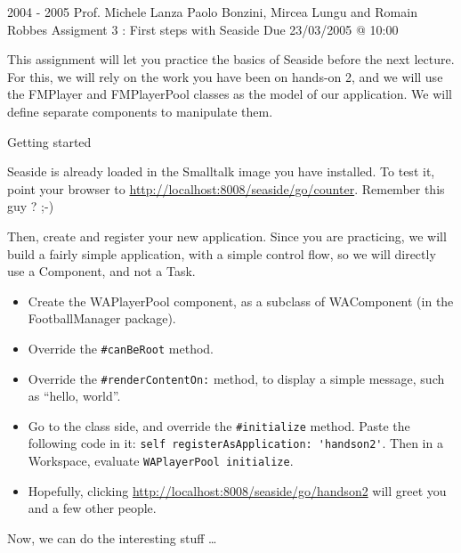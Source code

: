 \documentclass[a4paper,10pt]{scrartcl}
\begin{document}

	{2004 - 2005}
	{Prof. Michele Lanza}
	{Paolo Bonzini, Mircea Lungu and Romain Robbes}
	{Assigment 3 : First steps with Seaside}
	{Due 23/03/2005 @ 10:00}


This assignment will let you practice the basics of Seaside before the next
lecture. For this, we will rely on the work you have been on hands-on 2, and we
will use the FMPlayer and FMPlayerPool classes as the model of our application.
We will define separate components to manipulate them.

\begin{exercise}{Getting started}

Seaside is already loaded in the Smalltalk image you have installed.
To test it, point your browser to \textcolor{blue}{\url{http://localhost:8008/seaside/go/counter}}. Remember this guy ? ;-)

Then, create and register your new application. Since you are practicing, we
will build a fairly simple application, with a simple control flow,
so we will directly use a Component, and not a Task.

\begin{itemize}
	\item Create the WAPlayerPool component, as a subclass of WAComponent (in the FootballManager package).
	\item Override the \verb+#canBeRoot+ method.
	\item Override the \verb+#renderContentOn:+ method, to display a simple message, such as ``hello, world''.
	\item Go to the class side, and override the \verb+#initialize+ method. Paste the following code in it: \verb+self registerAsApplication: 'handson2'+.  Then in a Workspace, evaluate \verb+WAPlayerPool initialize+.
	\item Hopefully, clicking \textcolor{blue}{\url{http://localhost:8008/seaside/go/handson2}} will greet you and a few other people.
\end{itemize}

Now, we can do the interesting stuff \ldots

\end{exercise}
\end{document}
